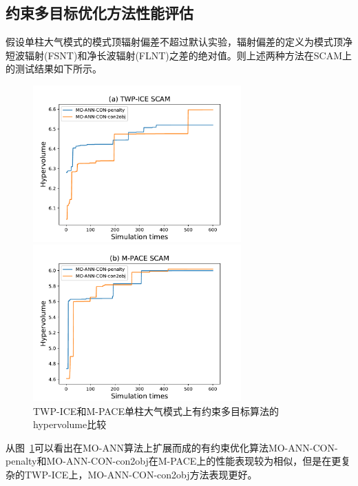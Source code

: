 \subsection{约束多目标优化方法性能评估}
假设单柱大气模式的模式顶辐射偏差不超过默认实验，辐射偏差的定义为模式顶净短波辐射(FSNT)和净长波辐射(FLNT)之差的绝对值。则上述两种方法在SCAM上的测试结果如下所示。
\begin{figure}[H]
\centering
\begin{minipage}[t]{0.48\textwidth}
\centering
\includegraphics[width=8cm]{figures/twpconstraint.pdf}
\end{minipage}
\begin{minipage}[t]{0.48\textwidth}
\centering
\includegraphics[width=8cm]{figures/constaint3.pdf}
\end{minipage}
\caption{TWP-ICE和M-PACE单柱大气模式上有约束多目标算法的hypervolume比较}
\label{fig:moconscam}
\end{figure}
从图~\ref{fig:moconscam}可以看出在MO-ANN算法上扩展而成的有约束优化算法MO-ANN-CON-penalty和MO-ANN-CON-con2obj在M-PACE上的性能表现较为相似，但是在更复杂的TWP-ICE上，MO-ANN-CON-con2obj方法表现更好。

